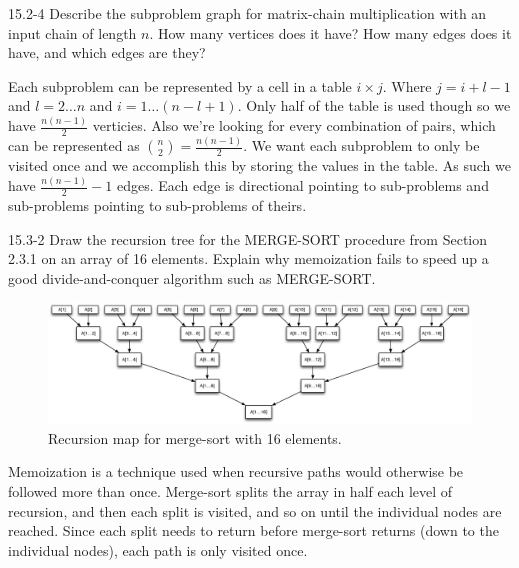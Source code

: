 \begin{problem}{15.2-4}
  Describe the subproblem graph for matrix-chain multiplication with an input chain of length $n$. How many vertices
  does it have? How many edges does it have, and which edges are they?
  \begin{solution}
    Each subproblem can be represented by a cell in a table $i\times j$. Where $j = i + l - 1$ and $l = 2\ldots n$ and
    $i = 1 \ldots (n - l + 1)$. Only half of the table is used though so we have $\frac{n(n - 1)}{2}$ verticies. Also
    we're looking for every combination of pairs, which can be represented as $\binom{n}{2} = \frac{n(n - 1)}{2}$.
    \br
    We want each subproblem to only be visited once and we accomplish this by storing the values in the table. As such
    we have $\frac{n(n - 1)}{2} - 1$ edges. Each edge is directional pointing to sub-problems and sub-problems pointing
    to sub-problems of theirs.
  \end{solution}
\end{problem}

\begin{problem}{15.3-2}
  Draw the recursion tree for the MERGE-SORT procedure from Section 2.3.1 on an array of 16 elements. Explain why
  memoization fails to speed up a good divide-and-conquer algorithm such as MERGE-SORT.
  \begin{solution}
    \begin{figure}[H]
      \centering
      \caption{Recursion map for merge-sort with 16 elements.}
      \includegraphics[scale=.35]{15_3_2.eps}
    \end{figure}
    Memoization is a technique used when recursive paths would otherwise be followed more than once. Merge-sort splits
    the array in half each level of recursion, and then each split is visited, and so on until the individual nodes are
    reached. Since each split needs to return before merge-sort returns (down to the individual nodes), each path is
    only visited once.
  \end{solution}
\end{problem}

